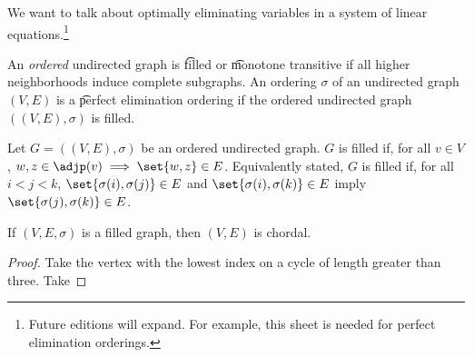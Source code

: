 

We want to talk about optimally eliminating variables in a system of linear equations.\footnote{Future editions will expand. For example, this sheet is needed for perfect elimination orderings.}


An \textit{ordered} undirected graph is \t{filled} or \t{monotone transitive} if all higher neighborhoods induce complete subgraphs.
An ordering $\sigma$ of an undirected graph $(V, E)$ is a \t{perfect elimination ordering} if the ordered undirected graph $((V, E), \sigma)$ is filled.

Let $G = ((V, E), \sigma)$ be an ordered undirected graph.
$G$ is filled if, for all $v \in V$, $w, z \in \adjp(v) \implies \set{w, z} \in E$.
Equivalently stated, $G$ is filled if, for all $i < j < k$, $\set{\sigma(i), \sigma(j)} \in E$ and $\set{\sigma(i), \sigma(k)} \in E$ imply $\set{\sigma(j), \sigma(k)} \in E$.


\begin{prop}
  If $(V, E, \sigma)$ is a filled graph, then $(V, E)$ is chordal.

  \begin{proof}
  Take the vertex with the lowest index on a cycle of length greater than three.
  Take
  \end{proof}
\end{prop}

\blankpage
